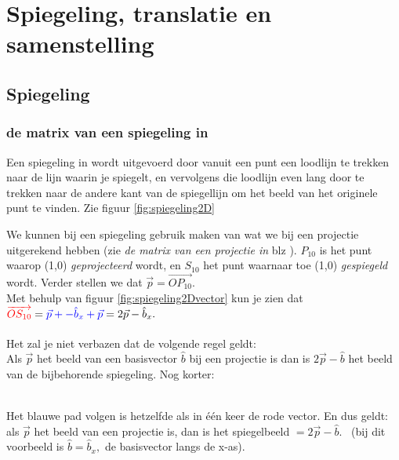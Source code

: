 \documentclass[hidelinks, a4wide, 12pt,  twoside]{book}
\begin{document}
\chapter{Spiegeling, translatie en samenstelling}
\label{chap: Spiegeling, translatie en samenstelling}
\section{Spiegeling}
\subsection{de matrix van een spiegeling in \RT}
Een spiegeling in \RT wordt uitgevoerd door vanuit een punt een loodlijn te trekken naar de lijn waarin je spiegelt, en vervolgens die loodlijn even lang door te trekken naar de andere kant van de spiegellijn om het beeld van het originele punt te vinden. Zie figuur \ref{fig:spiegeling2D}


  We kunnen bij een spiegeling gebruik maken van wat we bij een projectie uitgerekend hebben (zie 
\textit{de matrix van een projectie in \RT} blz \pageref{projectie2D}). $ P_{10}  $ is het punt waarop (1,0) \textit{geprojecteerd} wordt, en $ S_{10}  $ het punt  waarnaar toe (1,0) \textit{gespiegeld} wordt. Verder stellen we dat 
$\vec{p} = \overrightarrow{OP_{10} }. $\\ 
Met behulp van figuur \ref{fig:spiegeling2Dvector} kun je zien dat 
$  {\color{red} \overrightarrow{OS_{10} } }
=  {\color{blue} \vec{p}  + - \hat{b}_x+  \vec{p} }
= 2 \vec{p}  - \hat{b}_x. $ \\ \\
Het zal je  niet verbazen dat de volgende regel geldt:\\
Als $\vec{p} $ het beeld van een basisvector $ \hat{b}  $  bij een projectie is dan is $ 2 \vec{p}  - \hat{b} $ het beeld van de bijbehorende spiegeling. Nog korter: \\ \\

 { Het blauwe pad volgen is hetzelfde als  in één keer de rode vector.  
	En dus geldt: als $  \vec{p} $ het beeld van een projectie is, dan is het spiegelbeeld $ =  2\vec{p} - \hat{b}.  $ \  (bij dit voorbeeld  is $ \hat{b} = \hat{b}_x , $ de basisvector langs de x-as). }  
\end{document}

